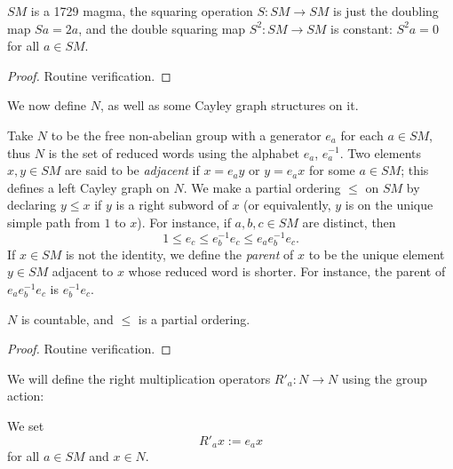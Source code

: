 \begin{lemma}\label{sm-1729} $SM$ is a 1729 magma, the squaring operation $S: SM \to SM$ is just the doubling map $Sa = 2a$, and the double squaring map $S^2: SM \to SM$ is constant: $S^2 a = 0$ for all $a \in SM$.
\end{lemma}

\begin{proof} Routine verification.
\end{proof}

We now define $N$, as well as some Cayley graph structures on it.

\begin{definition}[Definition of $N$]\label{n-def} Take $N$ to be the free non-abelian group with a generator $e_a$ for each $a \in SM$, thus $N$ is the set of reduced words using the alphabet $e_a$, $e_a^{-1}$.  Two elements $x,y \in SM$ are said to be \emph{adjacent} if $x = e_a y$ or $y = e_a x$ for some $a \in SM$; this defines a left Cayley graph on $N$.  We make a partial ordering $\leq$ on $SM$ by declaring $y \leq x$ if $y$ is a right subword of $x$ (or equivalently, $y$ is on the unique simple path from $1$ to $x$).  For instance, if $a,b,c \in SM$ are distinct, then
  $$ 1 \leq e_c \leq e_b^{-1} e_c \leq e_a e_b^{-1} e_c.$$
If $x \in SM$ is not the identity, we define the \emph{parent} of $x$ to be the unique element $y \in SM$ adjacent to $x$ whose reduced word is shorter.  For instance, the parent of $e_a e_b^{-1} e_c$ is $e_b^{-1} e_c$.
\end{definition}

\begin{lemma}\label{n-prop}  $N$ is countable, and $\leq$ is a partial ordering.
\end{lemma}

\begin{proof} Routine verification.
\end{proof}

We will define the right multiplication operators $R'_a: N \to N$ using the group action:

\begin{definition}[Definition of $R'_a$]\label{ra-defn} We set
  \begin{equation}\label{ra-def}
    R'_a x := e_a x
  \end{equation}
  for all $a \in SM$ and $x \in N$.
\end{definition}

